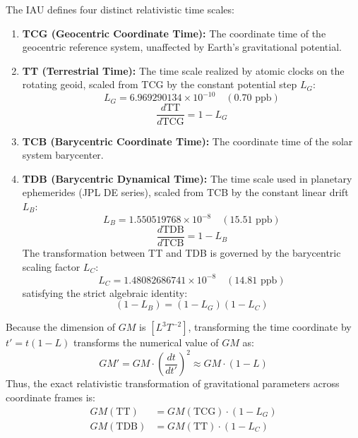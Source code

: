 \documentclass[11pt,a4paper]{article}
\begin{document}
The IAU defines four distinct relativistic time scales:
\begin{enumerate}
    \item \textbf{TCG (Geocentric Coordinate Time):} The coordinate time of the geocentric reference system, unaffected by Earth's gravitational potential.
    \item \textbf{TT (Terrestrial Time):} The time scale realized by atomic clocks on the rotating geoid, scaled from TCG by the constant potential step $L_G$:
    \begin{equation}
    L_G = 6.969290134 \times 10^{-10} \quad (0.70\text{ ppb})
    \end{equation}
    \begin{equation}
    \frac{d\text{TT}}{d\text{TCG}} = 1 - L_G
    \end{equation}
    \item \textbf{TCB (Barycentric Coordinate Time):} The coordinate time of the solar system barycenter.
    \item \textbf{TDB (Barycentric Dynamical Time):} The time scale used in planetary ephemerides (JPL DE series), scaled from TCB by the constant linear drift $L_B$:
    \begin{equation}
    L_B = 1.550519768 \times 10^{-8} \quad (15.51\text{ ppb})
    \end{equation}
    \begin{equation}
    \frac{d\text{TDB}}{d\text{TCB}} = 1 - L_B
    \end{equation}
    The transformation between TT and TDB is governed by the barycentric scaling factor $L_C$:
    \begin{equation}
    L_C = 1.48082686741 \times 10^{-8} \quad (14.81\text{ ppb})
    \end{equation}
    satisfying the strict algebraic identity:
    \begin{equation}
    (1 - L_B) = (1 - L_G)(1 - L_C)
    \end{equation}
\end{enumerate}

Because the dimension of $GM$ is $[L^3 T^{-2}]$, transforming the time coordinate by $t' = t(1 - L)$ transforms the numerical value of $GM$ as:
\begin{equation}
GM' = GM \cdot \left(\frac{dt}{dt'}\right)^2 \approx GM \cdot (1 - L)
\end{equation}
Thus, the exact relativistic transformation of gravitational parameters across coordinate frames is:
\begin{align}
GM(\text{TT}) &= GM(\text{TCG}) \cdot (1 - L_G) \label{eq:gm_tt_tcg} \\
GM(\text{TDB}) &= GM(\text{TT}) \cdot (1 - L_C) \label{eq:gm_tdb_tt}
\end{align}
\end{document}
